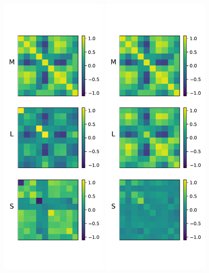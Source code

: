\begin{figure}
	\centering
	\includegraphics[width=0.48\textwidth]{fig/denise_output_finance.pdf}
	\includegraphics[width=0.48\textwidth]{fig/pcp_output_finance.pdf}

\end{figure}
